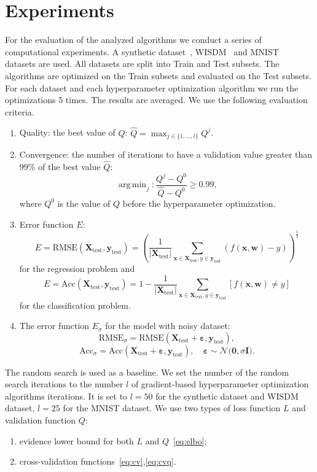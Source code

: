 \documentclass[smallcondensed]{svjour3}
\DeclareMathOperator*{\argmin}{arg\,min}
\begin{document}
\section{Experiments}
\label{experiments}
For the evaluation of the analyzed algorithms we conduct a series of computational experiments. A synthetic dataset~\cite{pyfos}, WISDM~\cite{wisdm} and MNIST~\cite{mnist} datasets are used. All datasets are split into Train and Test subsets. The algorithms are optimized on the Train subsets and evaluated on the Test subsets. For each dataset and each hyperparameter optimization algorithm we run the optimizations 5 times. The results are averaged. 
We use the following evaluation criteria.
\begin{enumerate}
\item Quality: the best value of $Q$:  $\hat{Q} = \max_{j \in \{1, \dots, l\}}Q^j$.
\item Convergence: the number of iterations to have a validation value greater than 99\% of the best value $\hat{Q}$:
\[
    \argmin_{j}: \frac{Q^j - Q^0}{\hat{Q} - Q^0} \geq 0.99,
\]
where $Q^0$ is the value of $Q$ before the hyperparameter optimization. 


\item Error function $E$:\[
    E = \text{RMSE}(\mathbf{X}_\text{test}, \mathbf{y}_\text{test}) = \left (\frac{1}{|\mathbf{X}_\text{test}|}\sum_{\mathbf{x} \in\mathbf{X}_\text{test}, y \in \mathbf{y}_\text{test}}  (f(\mathbf{x}, \mathbf{w})-y)\right)^{\frac{1}{2}}
\]
for the regression problem and
\[
    E = \text{Acc}(\mathbf{X}_\text{test}, \mathbf{y}_\text{test}) = 1 - \frac{1}{|\mathbf{X}_\text{test}|}\sum_{\mathbf{x} \in\mathbf{X}_\text{test}, y \in \mathbf{y}_\text{test}} [f(\mathbf{x}, \mathbf{w}) \neq y]
\]
for the classification problem.


\item The error function  $E_\sigma$ for the model with noisy dataset:
\[
    \text{RMSE}_\sigma =  \text{RMSE}(\mathbf{X}_\text{test} +  \boldsymbol{\varepsilon}, \mathbf{y}_\text{test}),\]\[\text{Acc}_\sigma =  \text{Acc}(\mathbf{X}_\text{test} +  \boldsymbol{\varepsilon}, \mathbf{y}_\text{test}),  \quad \boldsymbol{\varepsilon} \sim \mathcal{N}\bigl(\mathbf{0}, \sigma\mathbf{I}\bigr).
\]
\end{enumerate}



The random search is used as a baseline. We set the number of the random search iterations to the number $l$ of gradient-based hyperparameter optimization algorithms iterations. It is set to $l=50$ for the synthetic dataset and WISDM dataset, $l=25$ for the MNIST dataset. We use two types of loss function $L$ and validation function $Q$:
\begin{enumerate}
\item evidence lower bound for both $L$ and $Q$~\eqref{eq:elbo};
\item cross-validation functions~\eqref{eq:cv},\eqref{eq:cvq}.
\end{enumerate}
\end{document}
